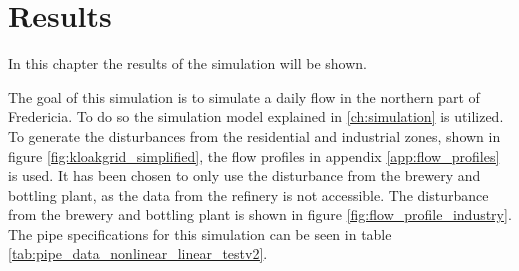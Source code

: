 \chapter{Results}\label{ch:results}
In this chapter the results of the simulation will be shown.


The goal of this simulation is to simulate a daily flow in the northern part of Fredericia. To do so the simulation model explained in \ref{ch:simulation} is utilized. To generate the disturbances from the residential and industrial zones, shown in figure \ref{fig:kloakgrid_simplified}, the flow profiles in appendix \ref{app:flow_profiles} is used. It has been chosen to only use the disturbance from the brewery and bottling plant, as the data from the refinery is not accessible. The disturbance from the brewery and bottling plant is shown in figure \ref{fig:flow_profile_industry}. The pipe specifications for this simulation can be seen in table \ref{tab:pipe_data_nonlinear_linear_testv2}.  
